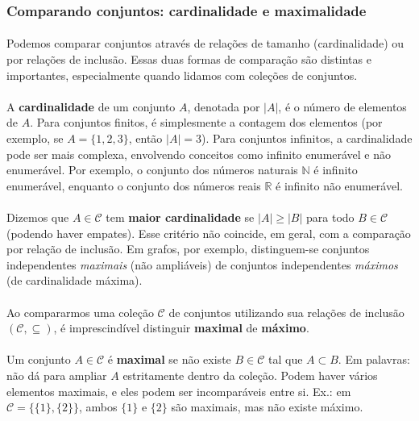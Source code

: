 \documentclass[12pt,a4paper]{article}
\begin{document}
\subsubsection{Comparando conjuntos: cardinalidade e maximalidade}

\paragraph{}
Podemos comparar conjuntos através de relações de tamanho (cardinalidade) ou por relações de inclusão. Essas duas formas de comparação são distintas e importantes, especialmente quando lidamos com coleções de conjuntos.

\paragraph{}
A \textbf{cardinalidade} de um conjunto \(A\), denotada por \(|A|\), é o número de elementos de \(A\). Para conjuntos finitos, é simplesmente a contagem dos elementos (por exemplo, se \(A=\{1,2,3\}\), então \(|A|=3\)). Para conjuntos infinitos, a cardinalidade pode ser mais complexa, envolvendo conceitos como infinito enumerável e não enumerável. Por exemplo, o conjunto dos números naturais \(\mathbb{N}\) é infinito enumerável, enquanto o conjunto dos números reais \(\mathbb{R}\) é infinito não enumerável.

\paragraph{}
Dizemos que \(A\in\mathcal{C}\) tem \textbf{maior cardinalidade} se \(|A|\ge |B|\) para todo \(B\in\mathcal{C}\) (podendo haver empates). Esse critério não coincide, em geral, com a comparação por relação de inclusão. Em grafos, por exemplo, distinguem-se conjuntos independentes \emph{maximais} (não ampliáveis) de conjuntos independentes \emph{máximos} (de cardinalidade máxima).

\paragraph{}
Ao compararmos uma coleção \(\mathcal{C}\) de conjuntos utilizando sua relações de inclusão \((\mathcal{C},\subseteq)\), é imprescindível distinguir \textbf{maximal} de \textbf{máximo}.

\paragraph{}
Um conjunto \(A\in\mathcal{C}\) é \textbf{maximal} se não existe \(B\in\mathcal{C}\) tal que \(A\subset B\). Em palavras: não dá para ampliar \(A\) estritamente dentro da coleção. Podem haver vários elementos maximais, e eles podem ser incomparáveis entre si. Ex.: em \(\mathcal{C}=\big\{\{1\},\{2\}\big\}\), ambos \(\{1\}\) e \(\{2\}\) são maximais, mas não existe máximo.
\end{document}
